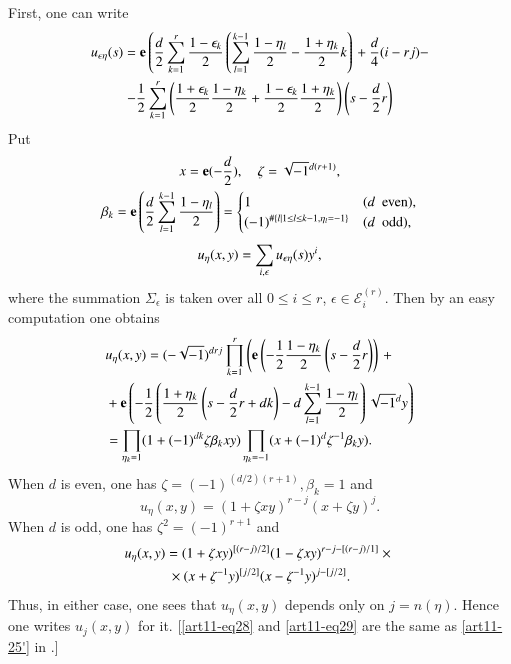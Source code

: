 First, one can write
\begin{gather*}
u_{\epsilon\eta}(s)=\mathbf{e}\left(\dfrac{d}{2}\sum\limits^{r}_{k=1}\frac{1-\epsilon_{k}}{2}\left(\sum\limits^{k-1}_{l=1}\frac{1-\eta_{l}}{2}-\frac{1+\eta_{k}}{2}k\right)\right.+\frac{d}{4}(i-rj)-\\
-\frac{1}{2}\sum\limits^{r}_{k=1}\left(\frac{1+\epsilon_{k}}{2}\frac{1-\eta_{k}}{2}+\frac{1-\epsilon_{k}}{2}\frac{1+\eta_{k}}{2}\right)\left(s-\frac{d}{2}r\right)
\end{gather*}
Put
\begin{gather*}
x=\mathbf{e}(-\frac{d}{2}),\quad \zeta=\sqrt{-1}^{d(r+1)},\\
\beta_{k}=\mathbf{e}\left(\dfrac{d}{2}\sum\limits^{k-1}_{l=1}\frac{1-\eta_{l}}{2}\right)=
\begin{cases}
1 & (d\text{~ even}),\\
(-1)^{\# \{l|1\leq l\leq k-1,\eta_{l}=-1\}} & (d\text{~ odd}),
\end{cases}\\[4pt]
u_{\eta}(x,y)=\sum\limits_{i,\epsilon}u_{\epsilon\eta}(s)y^{i}, 
\end{gather*}
where the summation $\Sigma_{\epsilon}$ is taken over all $0\leq i\leq r$, $\epsilon\in \mathscr{E}^{(r)}_{i}$. Then by an easy computation one obtains
\begin{align*}
& u_{\eta}(x,y)=(-\sqrt{-1})^{drj}\prod\limits^{r}_{k=1}\left(\mathbf{e}\left(-\frac{1}{2}\frac{1-\eta_{k}}{2}\left(s-\dfrac{d}{2}r\right)\right)\right.+{}\\
&{}+\mathbf{e} \left(-\frac{1}{2}\left(\frac{1+\eta_{k}}{2}\left(s-\frac{d}{2}r+dk\right)-d\sum\limits^{k-1}_{l=1}\frac{1-\eta_{l}}{2}\right)\sqrt{-1}^{d}y\right)\\
&= \prod\limits_{\eta_{k}=1}(1+(-1)^{dk}\zeta\beta_{k}xy)\prod\limits_{\eta_{k}=-1}(x+(-1)^{d}\zeta^{-1}\beta_{k}y).
\end{align*}
When $d$ is even, one has $\zeta=(-1)^{(d/2)(r+1)},\beta_{k}=1$ and
\begin{equation}
u_{\eta}(x,y)=(1+\zeta xy)^{r-j}(x+\zeta y)^{j}.
\end{equation}
When $d$ is odd, one has $\zeta^{2}=(-1)^{r+1}$ and 
\begin{gather}
u_{\eta}(x,y)=(1+\zeta xy)^{[(r-j)/2]}(1-\zeta xy)^{r-j-[(r-j)/1]}\times{}\label{art11-eq29}\\
{}\times (x+\zeta^{-1}y)^{[j/2]}(x-\zeta^{-1}y)^{j-[j/2]}.\notag
\end{gather}\pageoriginale
Thus, in either case, one sees that $u_{\eta}(x,y)$ depends only on $j=n(\eta)$. Hence one writes $u_{j}(x,y)$ for it. [\eqref{art11-eq28} and \eqref{art11-eq29} are the same as \eqref{art11-25'} in \cite{art11-keySF}.]

